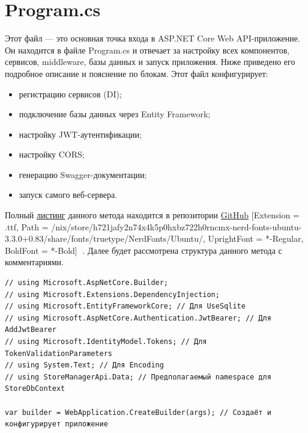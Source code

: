 \documentclass[12pt]{article}
\newcommand{\icon}[1]{\fontspec{UbuntuNerdFont}[Extension = .ttf,
  Path = /nix/store/h721jafy2n74x4k5p0hxbz722h0rncmx-nerd-fonts-ubuntu-3.3.0+0.83/share/fonts/truetype/NerdFonts/Ubuntu/,
  UprightFont = *-Regular,
BoldFont = *-Bold] #1}
\newcommand{\iicon}[1]{{\icon{#1}}}
\newcommand{\colorURL}[1]{\textcolor{CtpBlue}{#1}}
\newcommand{\colorGIT}[1]{\textcolor{CtpLavender}{#1}}
\renewcommand{\texttt}[1]{{\small\ttfamily #1}}
\newenvironment{code}
  {\par\captionsetup{type=listing}\noindent}
  {\par\vspace{\baselineskip}}
\numberwithin{listing}{section}
\numberwithin{figure}{section}
\begin{document}
\newpage

\section{Program.cs}
Этот файл — это основная точка входа в ASP.NET Core Web API-приложение. Он находится в файле \texttt{Program.cs} и отвечает за настройку всех компонентов, сервисов, middleware, базы данных и запуск приложения. Ниже приведено его подробное описание и пояснение по блокам.
Этот файл конфигурирует:
\begin{itemize}
	\item регистрацию сервисов (DI);
	\item подключение базы данных через Entity Framework;
	\item настройку JWT-аутентификации;
	\item настройку CORS;
	\item генерацию Swagger-документации;
	\item запуск самого веб-сервера.
\end{itemize}
Полный \colorGIT{\href{https://github.com/WebMasterIT/Csharp_Labs/blob/main/7lab_ASPNET/StoreManagerApi/Program.cs}{листинг}} данного метода находится в репозитории \colorURL{\href{https://github.com/WebMasterIT/Csharp_Labs/tree/main}{GitHub} \iicon{}}.
Далее будет рассмотрена структура данного метода с комментариями.

\begin{code}
	\begin{verbatim}
// using Microsoft.AspNetCore.Builder;
// using Microsoft.Extensions.DependencyInjection;
// using Microsoft.EntityFrameworkCore; // Для UseSqlite
// using Microsoft.AspNetCore.Authentication.JwtBearer; // Для AddJwtBearer
// using Microsoft.IdentityModel.Tokens; // Для TokenValidationParameters
// using System.Text; // Для Encoding
// using StoreManagerApi.Data; // Предполагаемый namespace для StoreDbContext

var builder = WebApplication.CreateBuilder(args); // Создаёт и конфигурирует приложение
\end{verbatim}
\end{code}
\end{document}
